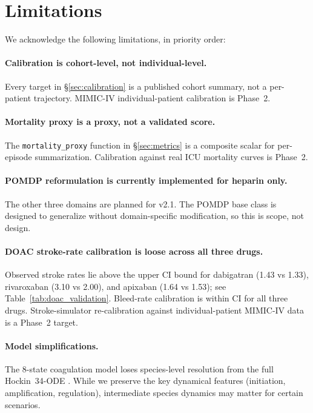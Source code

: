 \documentclass[11pt]{article}
\begin{document}
\section{Limitations}
\label{sec:limitations}

We acknowledge the following limitations, in priority order:


\paragraph{Calibration is cohort-level, not individual-level.} Every target in \S\ref{sec:calibration} is a published cohort summary, not a per-patient trajectory. MIMIC-IV individual-patient calibration is Phase~2.

\paragraph{Mortality proxy is a proxy, not a validated score.} The \texttt{mortality\_proxy} function in \S\ref{sec:metrics} is a composite scalar for per-episode summarization. Calibration against real ICU mortality curves is Phase~2.

\paragraph{POMDP reformulation is currently implemented for heparin only.} The other three domains are planned for v2.1. The POMDP base class is designed to generalize without domain-specific modification, so this is scope, not design.

\paragraph{DOAC stroke-rate calibration is loose across all three drugs.} Observed stroke rates lie above the upper CI bound for dabigatran (1.43 vs 1.33), rivaroxaban (3.10 vs 2.00), and apixaban (1.64 vs 1.53); see Table~\ref{tab:doac_validation}. Bleed-rate calibration is within CI for all three drugs. Stroke-simulator re-calibration against individual-patient MIMIC-IV data is a Phase~2 target.

\paragraph{Model simplifications.} The 8-state coagulation model loses species-level resolution from the full Hockin~34-ODE \citep{hockin2002}. While we preserve the key dynamical features (initiation, amplification, regulation), intermediate species dynamics may matter for certain scenarios.
\end{document}
